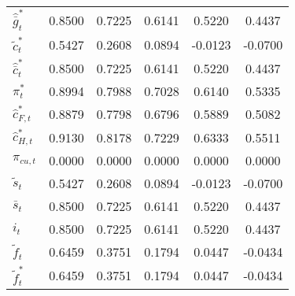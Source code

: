 \begin{center}
\begin{longtable}{lccccc}
${\hat {\bar g}_t^*}  $	 & 	    0.8500	 & 	    0.7225	 & 	    0.6141	 & 	    0.5220	 & 	    0.4437 \\ 
${\tilde c_t^*}       $	 & 	    0.5427	 & 	    0.2608	 & 	    0.0894	 & 	   -0.0123	 & 	   -0.0700 \\ 
${\hat {\bar c}_t^*}  $	 & 	    0.8500	 & 	    0.7225	 & 	    0.6141	 & 	    0.5220	 & 	    0.4437 \\ 
${\pi_t^*}            $	 & 	    0.8994	 & 	    0.7988	 & 	    0.7028	 & 	    0.6140	 & 	    0.5335 \\ 
${\hat c_{F,t}^*}     $	 & 	    0.8879	 & 	    0.7798	 & 	    0.6796	 & 	    0.5889	 & 	    0.5082 \\ 
${\hat c_{H,t}^*}     $	 & 	    0.9130	 & 	    0.8178	 & 	    0.7229	 & 	    0.6333	 & 	    0.5511 \\ 
${\pi_{cu,t}}         $	 & 	    0.0000	 & 	    0.0000	 & 	    0.0000	 & 	    0.0000	 & 	    0.0000 \\ 
${\tilde s_t}         $	 & 	    0.5427	 & 	    0.2608	 & 	    0.0894	 & 	   -0.0123	 & 	   -0.0700 \\ 
${\bar s_t}           $	 & 	    0.8500	 & 	    0.7225	 & 	    0.6141	 & 	    0.5220	 & 	    0.4437 \\ 
${i_t}                $	 & 	    0.8500	 & 	    0.7225	 & 	    0.6141	 & 	    0.5220	 & 	    0.4437 \\ 
${\tilde f_t}         $	 & 	    0.6459	 & 	    0.3751	 & 	    0.1794	 & 	    0.0447	 & 	   -0.0434 \\ 
${\tilde f_t^*}       $	 & 	    0.6459	 & 	    0.3751	 & 	    0.1794	 & 	    0.0447	 & 	   -0.0434 \\ 
\end{longtable}
 \end{center}
